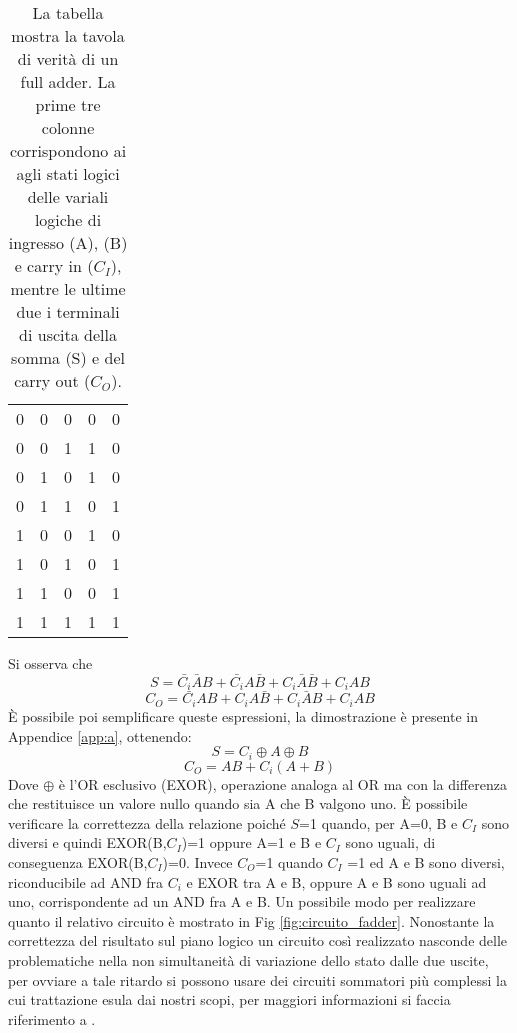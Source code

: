 \documentclass[a4paper,11pt]{article}
\begin{document}
	\begin{table}[h!]
		\centering
		\centering
		\begin{tabular}{|c|c|c|c|c|}
			\hline
			\cellcolor{yellow} \text{A} & \cellcolor{yellow} \text{B} & \cellcolor{yellow} \text{$C_I$} & \cellcolor{yellow} \text{$S$} & \cellcolor{yellow} \text{$C_O$} \\
			\hline
			0 & 0 & 0 & 0 & 0 \\
			0 & 0 & 1 & 1 & 0 \\
			0 & 1 & 0 & 1 & 0 \\
			0 & 1 & 1 & 0 & 1 \\
			1 & 0 & 0 & 1 & 0 \\
			1 & 0 & 1 & 0 & 1 \\
			1 & 1 & 0 & 0 & 1 \\
			1 & 1 & 1 & 1 & 1 \\
			\hline
		\end{tabular}
		\caption{La tabella mostra la tavola di verità di un full adder. La prime tre colonne corrispondono ai agli stati logici delle variali logiche di ingresso (A), (B) e  carry in ($C_I$), mentre le ultime due i terminali di uscita della somma (S) e del carry out ($C_O$). }
		\label{tab:full_adder}
	\end{table}
	
	Si osserva che 
	\begin{equation}
		S= \bar{C_i}\bar{A}B +\bar{C_i}A\bar{B}+C_i\bar{A}\bar{B}+C_iAB 
	\end{equation}
	\begin{equation}
		C_O= \bar{C_i}AB +C_iA\bar{B}+C_i\bar{A}B+C_iAB 
	\end{equation}
	È possibile poi semplificare queste espressioni, la dimostrazione è presente in Appendice \ref{app:a}, ottenendo:
	\begin{equation}
		S= C_i \oplus A \oplus B 
	\end{equation}
	\begin{equation}
		C_O= AB +C_i(A+B) 
	\end{equation}
	Dove $\oplus$ è l'OR esclusivo (EXOR), operazione analoga al OR ma con la differenza che restituisce un valore nullo quando sia A che B valgono uno.
	È possibile verificare la correttezza della relazione poiché $S$=1 quando, per A=0, B e $C_I$ sono diversi e quindi EXOR(B,$C_I$)=1 oppure A=1 e B e $C_I$ sono uguali, di conseguenza EXOR(B,$C_I$)=0. Invece $C_O$=1 quando $C_I$ =1 ed A e B sono diversi, riconducibile ad AND fra $C_i$ e EXOR tra A e B, oppure A e B sono uguali ad uno, corrispondente ad un AND fra A e B. Un possibile modo per realizzare quanto il relativo circuito è mostrato in Fig \ref{fig:circuito_fadder}. Nonostante la correttezza del risultato sul piano logico un circuito così realizzato nasconde delle problematiche nella non simultaneità di variazione dello stato dalle due uscite, per ovviare a tale ritardo si possono usare dei circuiti sommatori più complessi la cui trattazione esula dai nostri scopi, per maggiori informazioni si faccia riferimento a \cite{full_Adder}.
	
\end{document}
